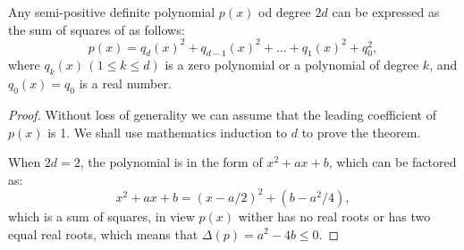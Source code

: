 \documentclass[runningheads]{llncs}
\begin{document}
\begin{theorem}
Any semi-positive definite polynomial $p(x)$
od degree $2d$ can be expressed as the sum of squares of as follows:
\begin{equation}
p(x) = {q_d(x)}^2 + {q_{d-1}(x)}^2 + \ldots + {q_1(x)}^2 + q_0^2,
\label{eq-0001}
\end{equation}
where $q_k(x)\, (1 \leq k \leq d)$ is a zero polynomial or a polynomial of degree $k$, and $q_0(x) = q_0$ is a real number.
\label{thm-1}
\end{theorem}

\begin{proof}
Without loss of generality we can assume that the leading coefficient of $p(x)$ is 1. We shall use mathematics induction to $d$ to prove the theorem. 

When $2d=2$, the polynomial is in the form of $x^2 + ax + b$, which can be factored as:
$$
x^2 + ax + b = \left(x - {a}/{2}\right)^2 + \left(b - {a^2}/{4}\right),
$$
which is a sum of squares, in view $p(x)$ wither has no real roots or has two equal real roots, which means that $\Delta(p)=a^2-4b\leq 0$. 


\end{proof}
\end{document}
